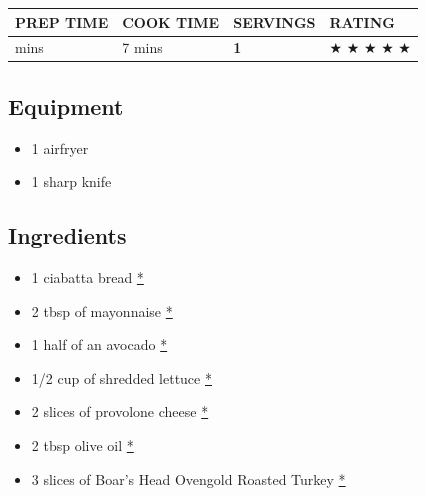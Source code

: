 \documentclass[
]{book}
\providecommand{\tightlist}{%
  \setlength{\itemsep}{0pt}\setlength{\parskip}{0pt}}
\begin{document}
\begin{longtable}[]{@{}llll@{}}
\toprule\noalign{}
\textbf{PREP TIME} & \textbf{COOK TIME} & \textbf{SERVINGS} &
\textbf{RATING} \\
\midrule\noalign{}
\endhead
\bottomrule\noalign{}
\endlastfoot
5 mins & 7 mins & \textbf{1} & ★ ★ ★ ★ ★ \\
\end{longtable}

\subsection*{Equipment}\label{equipment-3}

\begin{itemize}
\tightlist
\item
  1 airfryer
\item
  1 sharp knife
\end{itemize}

\subsection*{Ingredients}\label{ingredients-3}

\begin{itemize}
\tightlist
\item
  1 ciabatta bread
  \href{https://www.publix.com/pd/presliced-ciabatta-rolls-4-count/RIO-PCI-282539?origin=search1}{*}
\item
  2 tbsp of mayonnaise
  \href{https://www.publix.com/pd/hellmanns-real-mayonnaise-real-mayo-squeeze-bottle/RIO-PCI-509942?origin=search2}{*}
\item
  1 half of an avocado
  \href{https://www.publix.com/pd/hass-avocados/RIO-PCI-107578?origin=search1}{*}
\item
  1/2 cup of shredded lettuce
  \href{https://www.publix.com/pd/fresh-express-garden-salad-shreds-iceberg/RIO-PCI-107853?origin=search1}{*}
\item
  2 slices of provolone cheese
  \href{https://www.publix.com/pd/publix-not-smoked-provolone-cheese-slices/RIO-PCI-136662?origin=search3}{*}
\item
  2 tbsp olive oil
  \href{https://www.publix.com/pd/publix-olive-oil-extra-virgin/RIO-PCI-103897?origin=search1}{*}
\item
  3 slices of Boar's Head Ovengold Roasted Turkey
  \href{https://www.publix.com/pd/boars-head-ovengold-roasted-turkey-breast/RIO-DSM-100234?origin=search1}{*}
\end{itemize}
\end{document}
